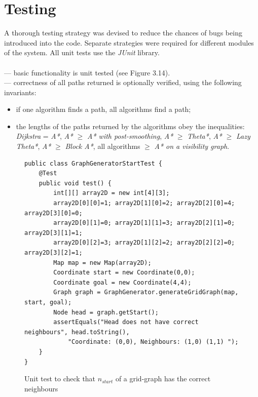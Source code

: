 \documentclass[12pt,notitlepage]{report}
\begin{document}
\section{Testing}

A thorough testing strategy was devised to reduce the chances of bugs being introduced into the code. Separate strategies were required for different modules of the system. All unit tests use the {\em JUnit} library.\\

\\

 --- basic functionality is unit tested (see Figure 3.14).\\


 --- correctness of all paths returned is optionally verified, using the following invariants:
  \begin{itemize}
  \item if one algorithm finds a path, all algorithms find a path;
  \item the lengths of the paths returned by the algorithms obey the inequalities: {\em Dijkstra} = {\em A*}, {\em A*} $\geq$ {\em A* with post-smoothing}, {\em A*} $\geq$ {\em Theta*}, {\em A*} $\geq$ {\em Lazy Theta*}, {\em A*} $\geq$ {\em Block A*}, all algorithms $\geq$ {\em A* on a visibility graph}.
  \end{itemize}  
  
  \begin{figure}
\begin{lstlisting}
public class GraphGeneratorStartTest {
	@Test
	public void test() {
		int[][] array2D = new int[4][3];
		array2D[0][0]=1; array2D[1][0]=2; array2D[2][0]=4; array2D[3][0]=0;
		array2D[0][1]=0; array2D[1][1]=3; array2D[2][1]=0; array2D[3][1]=1;
		array2D[0][2]=3; array2D[1][2]=2; array2D[2][2]=0; array2D[3][2]=1;
		Map map = new Map(array2D);
		Coordinate start = new Coordinate(0,0);
		Coordinate goal = new Coordinate(4,4);
		Graph graph = GraphGenerator.generateGridGraph(map, start, goal);
		Node head = graph.getStart();
		assertEquals("Head does not have correct neighbours", head.toString(), 
			"Coordinate: (0,0), Neighbours: (1,0) (1,1) ");
	}
}
\end{lstlisting}
\caption{Unit test to check that $n_{start}$ of a grid-graph has the correct neighbours}
\end{figure}
  
\end{document}

